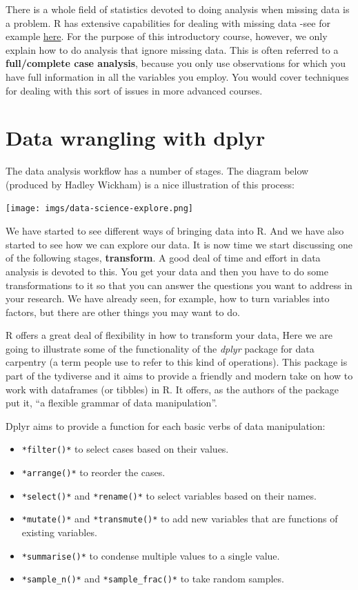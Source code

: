 \documentclass[
]{book}
\providecommand{\tightlist}{%
  \setlength{\itemsep}{0pt}\setlength{\parskip}{0pt}}
\begin{document}
There is a whole field of statistics devoted to doing analysis when missing data is a problem. R has extensive capabilities for dealing with missing data -see for example \href{http://www.crcpress.com/product/isbn/9781439868249}{here}. For the purpose of this introductory course, however, we only explain how to do analysis that ignore missing data. This is often referred to a \textbf{full/complete case analysis}, because you only use observations for which you have full information in all the variables you employ. You would cover techniques for dealing with this sort of issues in more advanced courses.

\hypertarget{data-wrangling-with-dplyr}{%
\section{Data wrangling with dplyr}\label{data-wrangling-with-dplyr}}

The data analysis workflow has a number of stages. The diagram below (produced by Hadley Wickham) is a nice illustration of this process:

\texttt{[image: imgs/data-science-explore.png]}

We have started to see different ways of bringing data into R. And we have also started to see how we can explore our data. It is now time we start discussing one of the following stages, \textbf{transform}. A good deal of time and effort in data analysis is devoted to this. You get your data and then you have to do some transformations to it so that you can answer the questions you want to address in your research. We have already seen, for example, how to turn variables into factors, but there are other things you may want to do.

R offers a great deal of flexibility in how to transform your data, Here we are going to illustrate some of the functionality of the \emph{dplyr} package for data carpentry (a term people use to refer to this kind of operations). This package is part of the tydiverse and it aims to provide a friendly and modern take on how to work with dataframes (or tibbles) in R. It offers, as the authors of the package put it, ``a flexible grammar of data manipulation''.

Dplyr aims to provide a function for each basic verbs of data manipulation:

\begin{itemize}
\tightlist
\item
  \texttt{*filter()*} to select cases based on their values.
\item
  \texttt{*arrange()*} to reorder the cases.
\item
  \texttt{*select()*} and \texttt{*rename()*} to select variables based on their names.
\item
  \texttt{*mutate()*} and \texttt{*transmute()*} to add new variables that are functions of existing variables.
\item
  \texttt{*summarise()*} to condense multiple values to a single value.
\item
  \texttt{*sample\_n()*} and \texttt{*sample\_frac()*} to take random samples.
\end{itemize}
\end{document}
